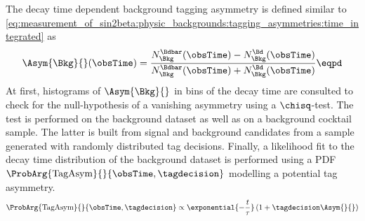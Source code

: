 The decay time dependent background tagging asymmetry is defined similar to 
\cref{eq:measurement_of_sin2beta:physic_backgrounds:tagging_asymmetries:time_integrated} as
%
\begin{equation}\label{eq:measurement_of_sin2beta:physic_backgrounds:tagging_asymmetries:time_dependent}
  \Asym{\Bkg}{}(\obsTime) = \frac{N_{\Bkg}^{\Bdbar}(\obsTime) - N_{\Bkg}^{\Bd}(\obsTime)}{N_{\Bkg}^{\Bdbar}(\obsTime) + N_{\Bkg}^{\Bd}(\obsTime)}\eqpd
\end{equation}
%
At first, histograms of $\Asym{\Bkg}{}$ in bins of the decay time are consulted
to check for the null-hypothesis of a vanishing asymmetry using a $\chisq$-test.
The test is performed on the background \sweighted dataset as well as on a
background \sweighted cocktail \MC sample. The latter is built from signal \MC
and background candidates from a \ToyMC sample generated with randomly
distributed tag decisions. Finally, a likelihood fit to the decay time
distribution of the background \sweighted dataset is performed using a \ac{PDF}
$\ProbArg{\text{TagAsym}}{}{\obsTime, \tagdecision}$ modelling a potential tag
asymmetry.
%
\begin{equation}\label{eq:measurement_of_sin2beta:physic_backgrounds:tagging_asymmetries:time_dependent:pdf}
  \ProbArg{\text{TagAsym}}{}{\obsTime, \tagdecision} \propto \exponential{- \frac{t}{\tau}} \left( 1 + \tagdecision \Asym{}{} \right)
\end{equation}

